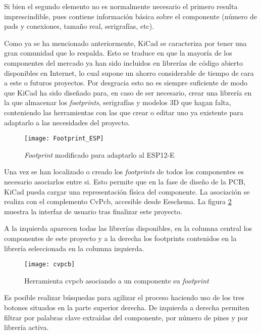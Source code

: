 Si bien el segundo elemento no es normalmente necesario el primero resulta imprescindible, pues contiene información básica sobre el componente (número de pads y conexiones, tamaño real, serigrafías, etc). 

Como ya se ha mencionado anteriormente, KiCad se caracteriza por tener una gran comunidad que lo respalda. Esto se traduce en que la mayoría de los componentes del mercado ya han sido incluidos en librerías de código abierto disponibles en Internet, lo cual supone un ahorro considerable de tiempo de cara a este o futuros proyectos. 
Por desgracia esto no es siempre suficiente de modo que KiCad ha sido diseñado para, en caso de ser necesario, crear una librería en la que almacenar los \textit{footprints}, serigrafías y modelos 3D que hagan falta, conteniendo las herramientas con las que crear o editar uno ya existente para adaptarlo a las necesidades del proyecto.

\begin{figure} [h]
    \centering
    \texttt{[image: Footprint\_ESP]}
    \caption{\textit{Footprint }modificado para adaptarlo al ESP12-E}
    \label{fig:Footprint_ESP}
\end{figure}

Una vez se han localizado o creado los \textit{footprints} de todos los componentes es necesario asociarlos entre si. Esto permite que en la fase de diseño de la \acrshort{PCB}, KiCad pueda cargar una representación física del componente. 
La asociación se realiza con el complemento CvPcb, accesible desde Eeschema. La figura \ref{fig:cvpcb} muestra la interfaz de usuario tras finalizar este proyecto.

\clearpage

A la izquierda aparecen todas las librerías disponibles, en la columna central los componentes de este proyecto y a la derecha los footprints contenidos en la librería seleccionada en la columna izquierda.

\begin{figure} [h]
    \centering
    \texttt{[image: cvpcb]}
    \caption{Herramienta cvpcb asociando a un componente su \textit{footprint}}
    \label{fig:cvpcb}
\end{figure}

Es posible realizar búsquedas para agilizar el proceso haciendo uso de los tres botones situados en la parte superior derecha. De izquierda a derecha permiten filtrar por palabras clave extraídas del componente, por número de pines y por librería activa.

